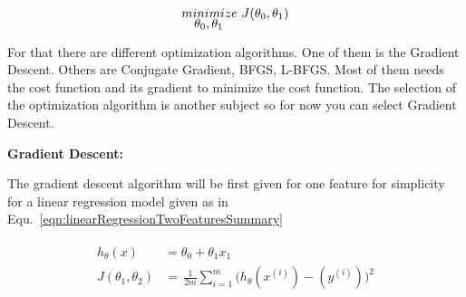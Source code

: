 \begin{equation}{\label{eqn:optimizationGoal}}
\underaccent{{\displaystyle \theta_0, \theta_1}}{minimize} \ J(\theta_0,\theta_1)
\end{equation} 

For that there are different optimization algorithms. One of them 
is the Gradient Descent.  Others are Conjugate Gradient, BFGS, L-BFGS. 
Most of them needs the cost function and its gradient to minimize the cost function. 
The selection of the optimization algorithm is another subject so for now you 
can select Gradient Descent.

\textbf{Gradient Descent:}

The gradient descent algorithm will be first given for one feature for simplicity 
for a linear regression model given as in Equ.~\ref{eqn:linearRegressionTwoFeaturesSummary}

\begin{align}
\label{eqn:linearRegressionTwoFeaturesSummary}
\begin{split}
h_{\theta}(x) & = \theta_0 + \theta_1 x_1 
\\
J(\theta_1,\theta_2)
 & =\,
\frac{1}{2m} \sum\limits_{i=1}^{m} \Big(h_\theta(x^{(i)}) - (y^{(i)})\Big)^2  
\end{split}
\end{align}


